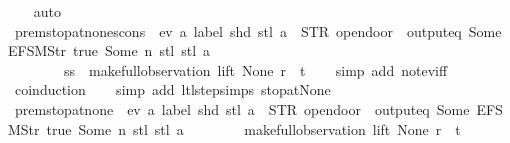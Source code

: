 \begin{isabellebody}
\ \ \isamarkupfalse%
\ auto%
\endisatagproof
{\isafoldproof}%
%
\isadelimproof
\isanewline
%
\endisadelimproof
\isanewline
{}\isamarkupfalse%
\ prem{\isacharunderscore}stop{\isacharunderscore}at{\isacharunderscore}none{\isacharunderscore}scons{\isacharcolon}\ {\isachardoublequoteopen}{\isasymnot}\ ev\ {\isacharparenleft}{\isasymlambda}a{\isachardot}\ label\ {\isacharparenleft}shd\ {\isacharparenleft}stl\ a{\isacharparenright}{\isacharparenright}\ {\isacharequal}\ STR\ {\isacharprime}{\isacharprime}opendoor{\isacharprime}{\isacharprime}\ {\isasymand}\ output{\isacharunderscore}eq\ {\isacharbrackleft}Some\ {\isacharparenleft}EFSM{\isachardot}Str\ {\isacharprime}{\isacharprime}true{\isacharprime}{\isacharprime}{\isacharparenright}{\isacharcomma}\ Some\ n{\isacharbrackright}\ {\isacharparenleft}stl\ {\isacharparenleft}stl\ a{\isacharparenright}{\isacharparenright}{\isacharparenright}\isanewline
\ \ \ \ \ \ \ \ {\isacharparenleft}ss\ {\isacharhash}{\isacharhash}\ make{\isacharunderscore}full{\isacharunderscore}observation\ lift\ None\ r\ {\isacharbrackleft}{\isacharbrackright}\ t{\isacharparenright}{\isachardoublequoteclose}\isanewline
%
\isadelimproof
\ \ %
\endisadelimproof
%
\isatagproof
{}\isamarkupfalse%
\ {\isacharparenleft}simp\ add{\isacharcolon}\ not{\isacharunderscore}ev{\isacharunderscore}iff{\isacharparenright}\isanewline
\ \ \isamarkupfalse%
\ {\isacharparenleft}coinduction{\isacharparenright}\isanewline
\ \ \isamarkupfalse%
\ {\isacharparenleft}simp\ add{\isacharcolon}\ ltl{\isacharunderscore}step{\isachardot}simps\ stop{\isacharunderscore}at{\isacharunderscore}None{\isacharparenright}%
\endisatagproof
{\isafoldproof}%
%
\isadelimproof
\isanewline
%
\endisadelimproof
\isanewline
{}\isamarkupfalse%
\ prem{\isacharunderscore}stop{\isacharunderscore}at{\isacharunderscore}none{\isacharcolon}\ {\isachardoublequoteopen}{\isasymnot}\ ev\ {\isacharparenleft}{\isasymlambda}a{\isachardot}\ label\ {\isacharparenleft}shd\ {\isacharparenleft}stl\ a{\isacharparenright}{\isacharparenright}\ {\isacharequal}\ STR\ {\isacharprime}{\isacharprime}opendoor{\isacharprime}{\isacharprime}\ {\isasymand}\ output{\isacharunderscore}eq\ {\isacharbrackleft}Some\ {\isacharparenleft}EFSM{\isachardot}Str\ {\isacharprime}{\isacharprime}true{\isacharprime}{\isacharprime}{\isacharparenright}{\isacharcomma}\ Some\ n{\isacharbrackright}\ {\isacharparenleft}stl\ {\isacharparenleft}stl\ a{\isacharparenright}{\isacharparenright}{\isacharparenright}\isanewline
\ \ \ \ \ \ \ \ {\isacharparenleft}make{\isacharunderscore}full{\isacharunderscore}observation\ lift\ None\ r\ {\isacharbrackleft}{\isacharbrackright}\ t{\isacharparenright}{\isachardoublequoteclose}\isanewline

\end{isabellebody}

